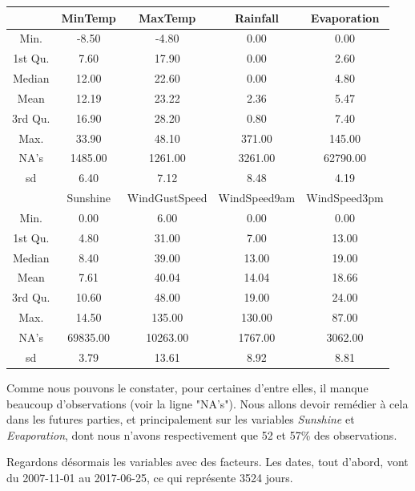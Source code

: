 \documentclass{article}
\begin{document}
\begin{table}[H]
    \centering
    \begin{tabular}{*{5}{|c}|}
        \hline
        & MinTemp & MaxTemp & Rainfall & Evaporation \\ 
        \hline
        Min. & -8.50 & -4.80 & 0.00 & 0.00 \\ 
        1st Qu. & 7.60 & 17.90 & 0.00 & 2.60 \\ 
        Median & 12.00 & 22.60 & 0.00 & 4.80 \\ 
        Mean & 12.19 & 23.22 & 2.36 & 5.47 \\ 
        3rd Qu. & 16.90 & 28.20 & 0.80 & 7.40 \\ 
        Max. & 33.90 & 48.10 & 371.00 & 145.00 \\ 
        NA's & 1485.00 & 1261.00 & 3261.00 & 62790.00 \\ 
        sd & 6.40 & 7.12 & 8.48 & 4.19 \\ 
        \hline
        \hline
        & Sunshine & WindGustSpeed & WindSpeed9am & WindSpeed3pm \\ 
        \hline
        Min. & 0.00 & 6.00 & 0.00 & 0.00 \\ 
        1st Qu. & 4.80 & 31.00 & 7.00 & 13.00 \\ 
        Median & 8.40 & 39.00 & 13.00 & 19.00 \\ 
        Mean & 7.61 & 40.04 & 14.04 & 18.66 \\ 
        3rd Qu. & 10.60 & 48.00 & 19.00 & 24.00 \\ 
        Max. & 14.50 & 135.00 & 130.00 & 87.00 \\ 
        NA's & 69835.00 & 10263.00 & 1767.00 & 3062.00 \\ 
        sd & 3.79 & 13.61 & 8.92 & 8.81 \\ 
        \hline
    \end{tabular}
\end{table}

Comme nous pouvons le constater, pour certaines d'entre elles, il manque beaucoup d'observations (voir la ligne "NA's"). Nous allons devoir remédier à cela dans les futures parties, et principalement sur les variables \emph{Sunshine} et \emph{Evaporation}, dont nous n'avons respectivement que 52 et 57\% des observations.

Regardons désormais les variables avec des facteurs. Les dates, tout d'abord, vont du 2007-11-01 au 2017-06-25, ce qui représente 3524 jours. 
\end{document}
